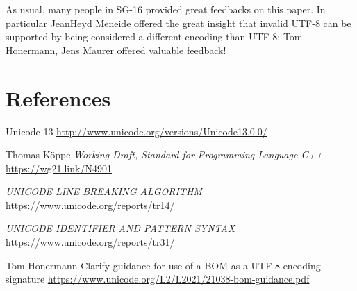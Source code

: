 \documentclass{wg21}
\begin{document}
As usual, many people in SG-16 provided great feedbacks on this paper.
In particular JeanHeyd Meneide offered the great insight that invalid UTF-8 can be supported by being considered a different encoding than UTF-8; Tom Honermann, Jens Maurer offered valuable feedback!


\section{References}
\renewcommand{\section}[2]{}%



\begin{thebibliography}{9}


Unicode 13\newline
\url{http://www.unicode.org/versions/Unicode13.0.0/}

Thomas Köppe
\emph{Working Draft, Standard for Programming Language C++}\newline
\url{https://wg21.link/N4901}

\emph{UNICODE LINE BREAKING ALGORITHM}\newline
\url{https://www.unicode.org/reports/tr14/}

\emph{UNICODE IDENTIFIER AND PATTERN SYNTAX}\newline
\url{https://www.unicode.org/reports/tr31/}

Tom Honermann
Clarify guidance for use of a BOM as a UTF-8 encoding signature
\url{https://www.unicode.org/L2/L2021/21038-bom-guidance.pdf}


\end{thebibliography}
\end{document}
